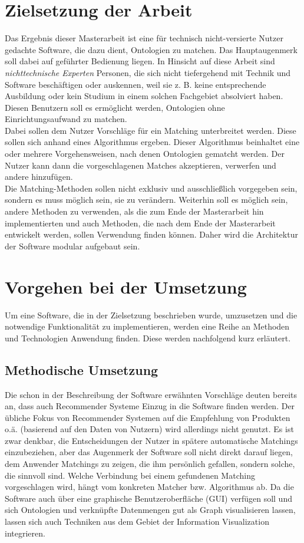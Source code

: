 \section{Zielsetzung der Arbeit}
Das Ergebnis dieser Masterarbeit ist eine für technisch nicht-versierte Nutzer
gedachte Software, die dazu dient, Ontologien zu matchen. Das Hauptaugenmerk
soll dabei auf geführter Bedienung liegen. In Hinsicht auf diese Arbeit sind
\textit{nichttechnische Experten} Personen, die sich nicht tiefergehend mit
Technik und Software beschäftigen oder auskennen, weil sie z. B. keine
entsprechende Ausbildung oder kein Studium in einem solchen Fachgebiet
absolviert haben.
Diesen Benutzern soll es ermöglicht werden, Ontologien ohne Einrichtungsaufwand
zu matchen.\\
Dabei sollen dem Nutzer Vorschläge für ein Matching unterbreitet werden. Diese
sollen sich anhand eines Algorithmus ergeben. Dieser Algorithmus
beinhaltet eine oder mehrere Vorgehensweisen, nach denen Ontologien gematcht werden. Der Nutzer
kann dann die vorgeschlagenen Matches akzeptieren, verwerfen und andere hinzufügen.\\
Die Matching-Methoden sollen nicht exklusiv und ausschließlich vorgegeben sein,
sondern es muss möglich sein, sie zu verändern. Weiterhin soll es möglich sein,
andere  Methoden zu verwenden, als die zum Ende der Masterarbeit hin
implementierten und auch Methoden, die nach dem Ende der Masterarbeit entwickelt
werden, sollen Verwendung finden können. Daher wird die
Architektur der Software modular aufgebaut sein.

\section{Vorgehen bei der Umsetzung}
Um eine Software, die in der Zielsetzung beschrieben wurde, umzusetzen und die
notwendige Funktionalität zu implementieren, werden eine Reihe an Methoden und
Technologien Anwendung finden. Diese werden nachfolgend kurz erläutert.

\subsection{Methodische Umsetzung}
Die schon in der Beschreibung der
Software erwähnten Vorschläge deuten bereits an, dass auch Recommender Systeme
Einzug in die Software finden werden. Der übliche Fokus von Recommender Systemen
auf die Empfehlung von Produkten o.ä. (basierend auf den Daten von Nutzern) wird
allerdings nicht genutzt. Es ist zwar denkbar, die Entscheidungen der Nutzer in
spätere automatische Matchings einzubeziehen, aber das Augenmerk der Software soll nicht direkt darauf liegen, dem Anwender Matchings
zu zeigen, die ihm persönlich gefallen, sondern solche, die sinnvoll sind.
Welche Verbindung bei einem gefundenen Matching vorgeschlagen wird, hängt vom
konkreten Matcher bzw. Algorithmus ab. Da die Software auch über eine graphische
Benutzeroberfläche (GUI) verfügen soll und sich Ontologien und verknüpfte
Datenmengen gut als Graph visualisieren lassen, lassen sich auch Techniken aus
dem Gebiet der Information Visualization integrieren.

